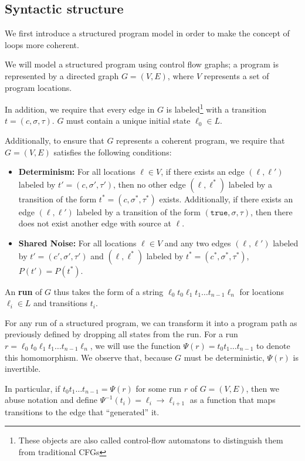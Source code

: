 
\subsection{Syntactic structure}

We first introduce a structured program model in order to make the concept of loops more coherent. 

We will model a structured program  using control flow graphs; a program is represented by a directed graph $G = (V, E)$, where $V$ represents a set of program locations. 

In addition, we require that every edge in $G$ is labeled\footnote{These objects are also called control-flow automatons to distinguish them from traditional CFGs} with a transition $t = (c, \sigma, \tau)$. $G$ must contain a unique initial state $\ell_0 \in L$.

Additionally, to ensure that $G$ represents a coherent program, we require that $G = (V, E)$ satisfies the following conditions: 
\begin{itemize}
    \item \textbf{Determinism:} For all locations $\ell\in V$, if there exists an edge $(\ell, \ell')$ labeled by $t'=(c, \sigma', \tau')$, then no other edge $(\ell, \ell^*)$ labeled by a transition of the form $t^* = (c, \sigma^*, \tau^*)$ exists. 
    Additionally, if there exists an edge $(\ell, \ell')$ labeled by a transition of the form $(\texttt{true}, \sigma, \tau)$, then there does not exist another edge with source at $\ell$.
    \item \textbf{Shared Noise:} For all locations $\ell\in V$ and any two edges $(\ell, \ell')$ labeled by $t'=(c', \sigma', \tau')$ and $(\ell, \ell^*)$ labeled by $t^* = (c^*, \sigma^*, \tau^*)$, $P(t') = P(t^*)$. 
\end{itemize}

An \textbf{run} of $G$ thus takes the form of a string $\ell_0t_0\ell_1t_1\ldots t_{n-1}\ell_n$ for locations $\ell_i\in L$ and transitions $t_i$.

For any run of a structured program, we can transform it into a program path as previously defined by dropping all states from the run. For a run $r=\ell_0t_0\ell_1t_1\ldots t_{n-1}\ell_n$, we will use the function $\Psi(r) = t_0t_1\ldots t_{n-1}$ to denote this homomorphism. We observe that, because $G$ must be deterministic, $\Psi(r)$ is invertible. 

In particular, if $t_0t_1\ldots t_{n-1} = \Psi(r)$ for some run $r$ of $G = (V, E)$, then we abuse notation and define $\Psi^{-1}(t_i) = \ell_i\to\ell_{i+1}$ as a function that maps transitions to the edge that ``generated'' it. 


